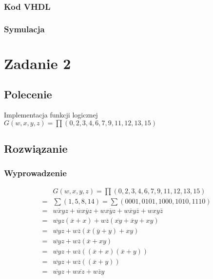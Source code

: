 \documentclass[a4paper,12pt]{extarticle}  %
\begin{document}
\subsubsection{Kod VHDL}
\subsubsection{Symulacja}
\section{Zadanie 2}
\subsection{Polecenie}
Implementacja funkcji logicznej \textbf{$G(w,x,y,z) = \prod(0, 2, 3, 4, 6, 7, 9, 11, 12, 13, 15)$}
\subsection{Rozwiązanie}
\subsubsection{Wyprowadzenie}
\begin{align}
	  & G(w,x,y,z) = \prod(0, 2, 3, 4, 6, 7, 9, 11, 12, 13, 15)                                                       \\
	= & \sum(1,5,8,14) = \sum(0001, 0101, 1000, 1010, 1110)                                                           \\
	= & \overline{wxy}z + \overline{w}x\overline{y}z + w\overline{xyz} + w\overline{x}y\overline{z} + wxy\overline{z} \\
	= & \overline{wy}z(\overline{x} + x) + w\overline{z}(\overline{xy} + \overline{x}y + xy)                          \\
	= & \overline{wy}z + w\overline{z}(\overline{x}(\overline{y} + y) + xy)                                           \\
	= & \overline{wy}z + w\overline{z}(\overline{x} + xy)                                                             \\
	= & \overline{wy}z + w\overline{z}((\overline{x} + x)(\overline{x} + y))                                          \\
	= & \overline{wy}z + w\overline{z}((\overline{x} + y))                                                            \\
	= & \overline{wy}z + w\overline{xz} + w\overline{z}y
\end{align}
\end{document}
